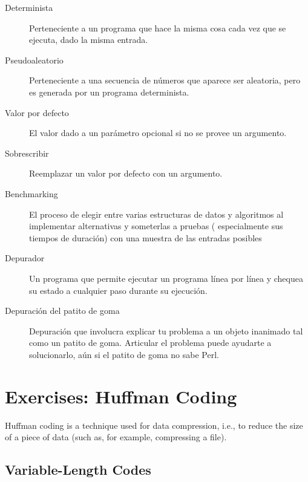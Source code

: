 \begin{description}

\item[Determinista] Perteneciente a un programa que hace la misma
cosa cada vez que se ejecuta, dado la misma entrada.

\item[Pseudoaleatorio] Perteneciente a una secuencia de números que
aparece ser aleatoria, pero es generada por un programa determinista.

\item[Valor por defecto] El valor dado a un parámetro opcional si 
no se provee un argumento.

\item[Sobrescribir] Reemplazar un valor por defecto con un argumento.

\item[Benchmarking] El proceso de elegir entre varias estructuras de datos
y algoritmos al implementar alternativas y someterlas a pruebas (
especialmente sus tiempos de duración) con una muestra de las entradas
posibles

\item[Depurador] Un programa que permite ejecutar un programa línea
por línea y chequea su estado a cualquier paso durante su ejecución.

\item[Depuración del patito de goma] Depuración que involucra 
explicar tu problema a un objeto inanimado tal como un patito de goma.
Articular el problema puede ayudarte a solucionarlo, aún si el patito
de goma no sabe Perl.

\end{description}

\section{Exercises: Huffman Coding}
\label{huffman_exercise}

Huffman coding is a technique used for data compression, i.e., 
to reduce the size of a piece of data (such as, for example, 
compressing a file).

\subsection{Variable-Length Codes}

